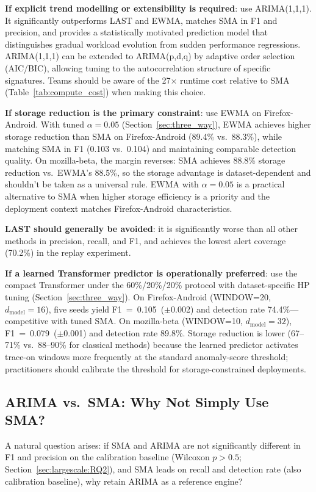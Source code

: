 \documentclass[pdflatex,sn-nature]{sn-jnl}
\theoremstyle{thmstyleone}%
\begin{document}
\textbf{If explicit trend modelling or extensibility is required}: use
ARIMA(1,1,1).
It significantly outperforms LAST and EWMA, matches SMA in F1 and precision,
and provides a statistically motivated prediction model that distinguishes
gradual workload evolution from sudden performance regressions.
ARIMA(1,1,1) can be extended to ARIMA(p,d,q) by adaptive order selection
(AIC/BIC), allowing tuning to the autocorrelation structure of specific
signatures.
Teams should be aware of the 27$\times$ runtime cost relative to SMA
(Table~\ref{tab:compute_cost}) when making this choice.

\textbf{If storage reduction is the primary constraint}: use EWMA on
Firefox-Android.
With tuned $\alpha=0.05$ (Section~\ref{sec:three_way}), EWMA achieves
higher storage reduction than SMA on Firefox-Android (89.4\% vs.\ 88.3\%),
while matching SMA in F1 (0.103 vs.\ 0.104) and maintaining comparable
detection quality.
On mozilla-beta, the margin reverses: SMA achieves 88.8\% storage reduction
vs.\ EWMA's 88.5\%, so the storage advantage is dataset-dependent and
shouldn't be taken as a universal rule.
EWMA with $\alpha=0.05$ is a practical alternative to SMA when higher
storage efficiency is a priority and the deployment context matches
Firefox-Android characteristics.

\textbf{LAST should generally be avoided}: it is significantly worse than
all other methods in precision, recall, and F1, and achieves the lowest
alert coverage (70.2\%) in the replay experiment.

\textbf{If a learned Transformer predictor is operationally preferred}:
use the compact Transformer under the 60\%/20\%/20\% protocol with
dataset-specific HP tuning (Section~\ref{sec:three_way}).
On Firefox-Android (WINDOW=20, $d_{\text{model}}=16$), five seeds yield
F1~=~0.105~($\pm$0.002) and detection rate 74.4\%---competitive with
tuned SMA.
On mozilla-beta (WINDOW=10, $d_{\text{model}}=32$), F1~=~0.079~($\pm$0.001)
and detection rate 89.8\%.
Storage reduction is lower (67--71\% vs.\ 88--90\% for classical methods)
because the learned predictor activates trace-on windows more frequently
at the standard anomaly-score threshold; practitioners should calibrate the
threshold for storage-constrained deployments.

\subsection{ARIMA vs.\ SMA: Why Not Simply Use SMA?}

A natural question arises: if SMA and ARIMA are not significantly different in
F1 and precision on the calibration baseline (Wilcoxon $p > 0.5$;
Section~\ref{sec:largescale:RQ2}), and SMA leads on recall and detection rate
(also calibration baseline), why retain ARIMA as a reference engine?
\end{document}
